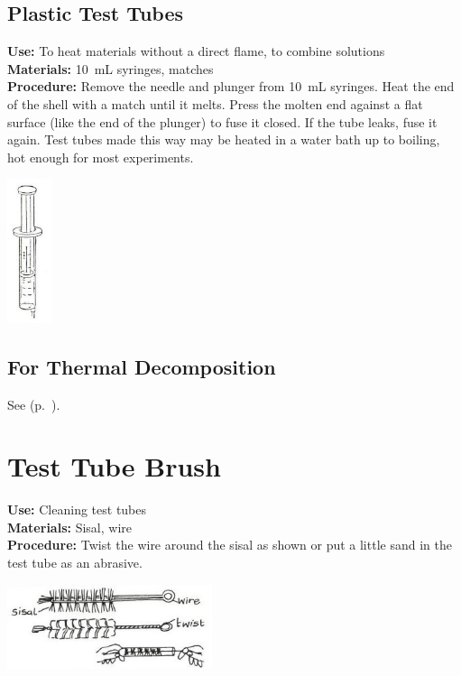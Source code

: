 \begin{multicols}{2}
\subsection{Plastic Test Tubes}
\vspace{-6pt}
\textbf{Use:} To heat materials without a direct flame, to combine solutions\\
\textbf{Materials:} 10~mL syringes, matches\\
\textbf{Procedure:} Remove the needle and plunger from 10~mL syringes. Heat the end of the shell with a match until it melts. Press the molten end against a flat surface (like the end of the plunger) to fuse it closed. If the tube leaks, fuse it again. Test tubes made this way may be heated in a water bath up to boiling, hot enough for most experiments.
\begin{center}
\includegraphics[width=0.1\textwidth]{./img/source/syringe.jpg}
\end{center}

\subsection{For Thermal Decomposition}
See  (p.~\pageref{sec:deflagratingspoon}).

\section{Test Tube Brush}
\label{sec:test-tube-brush}
\vspace{-10pt}
\textbf{Use:} Cleaning test tubes\\
\textbf{Materials:} Sisal, wire\\
\textbf{Procedure:} Twist the wire around the sisal as shown or put a little sand in the test tube as an abrasive.
\begin{center}
\includegraphics[width=0.45\textwidth]{./img/vso/test-tube-brush.jpg}
\end{center}


\end{multicols}
